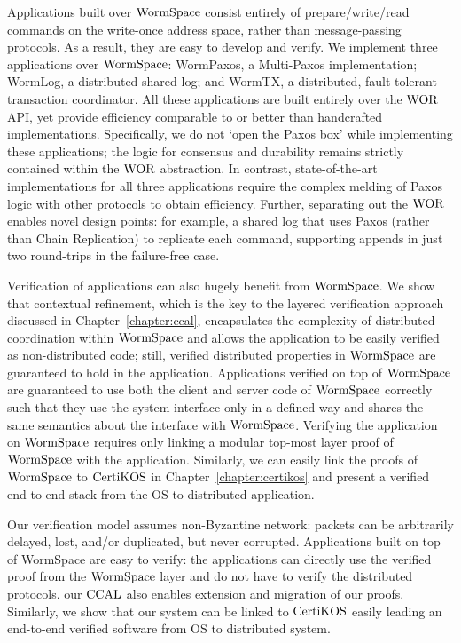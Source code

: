 Applications built over $\mathrm{WormSpace}$ consist entirely of prepare/write/read commands on the write-once address space, rather than message-passing protocols. As a result, they are easy to develop and verify. We implement three applications over $\mathrm{WormSpace}$: WormPaxos, a Multi-Paxos implementation; WormLog, a distributed shared log; and WormTX, a distributed, fault tolerant transaction coordinator. All these applications are built entirely over the $\mathrm{WOR}$ API, yet provide efficiency comparable to or better than handcrafted implementations. Specifically, we do not `open the Paxos box' while implementing these applications; the logic for consensus and durability remains strictly contained within the $\mathrm{WOR}$ abstraction. In contrast, state-of-the-art implementations for all three applications require the complex melding of Paxos logic with other protocols to obtain efficiency. Further, separating out the $\mathrm{WOR}$ enables novel design points: for example, a shared log that uses Paxos (rather than Chain Replication) to replicate each command, supporting appends in just two round-trips in the failure-free case.

Verification of applications can also hugely benefit from $\mathrm{WormSpace}$. We show that contextual refinement, which is the key to the layered verification approach discussed in Chapter~\ref{chapter:ccal}, encapsulates the complexity of distributed coordination within $\mathrm{WormSpace}$ and allows the application to be easily verified as non-distributed code; still, verified distributed properties in $\mathrm{WormSpace}$ are guaranteed to hold in the application. Applications verified on top of $\mathrm{WormSpace}$ are guaranteed to use both the client and server code of $\mathrm{WormSpace}$ correctly such that they use the system interface only in a defined way and shares the same semantics about the interface with $\mathrm{WormSpace}$. Verifying the application on $\mathrm{WormSpace}$ requires only linking a modular top-most layer proof of $\mathrm{WormSpace}$ with the application. Similarly, we can easily link the proofs of $\mathrm{WormSpace}$ to $\mathrm{CertiKOS}$ in Chapter~\ref{chapter:certikos} and present a verified end-to-end stack from the OS to distributed application.

Our verification model assumes non-Byzantine network: packets can be arbitrarily delayed, lost, and/or duplicated, but never corrupted. Applications built on top of WormSpace are easy to verify: the applications can directly use the verified proof from the $\mathrm{WormSpace}$ layer and do not have to verify the distributed protocols. our $\mathrm{CCAL}$ also enables extension and migration of our proofs. Similarly, we show that our system can be linked to $\mathrm{CertiKOS}$ easily leading an end-to-end verified software from OS to distributed system.



